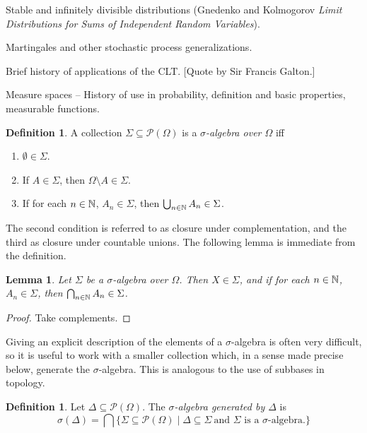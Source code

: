 \documentclass{amsart}
\newtheorem{lemma}[theorem]{Lemma}
\theoremstyle{definition}
\newtheorem{definition}[theorem]{Definition}
\theoremstyle{remark}
\newcommand{\bldset}[2]{\{{#1}\mid{#2}\}}
\begin{document}
Stable and infinitely divisible distributions (Gnedenko and Kolmogorov {\em Limit Distributions for Sums of Independent Random Variables}).

Martingales and other stochastic process generalizations.

Brief history of applications of the CLT. [Quote by Sir Francis Galton.]


Measure spaces -- History of use in probability, definition and basic properties, measurable functions.

\begin{definition}
A collection $\Sigma \subseteq \mathcal P (\Omega)$ is a {\em $\sigma$-algebra over $\Omega$} iff
\begin{enumerate}
\item $\emptyset \in \Sigma$.
\item If $A \in \Sigma$, then $\Omega \setminus A \in \Sigma$.
\item If for each $n \in \mathbb{N}$, $A_n \in \Sigma$, then $\bigcup_{n \in \mathbb{N}} A_n \in \Sigma$.
\end{enumerate}
\end{definition}

The second condition is referred to as closure under complementation, and the third as closure under countable unions. The following lemma is immediate from the definition.

\begin{lemma}
Let $\Sigma$ be a $\sigma$-algebra over $\Omega$. Then $X \in \Sigma$, and if for each $n \in \mathbb{N}$, $A_n \in \Sigma$, then $\bigcap_{n \in \mathbb{N}} A_n \in \Sigma$.
\end{lemma}

\begin{proof}
Take complements.
\end{proof}

Giving an explicit description of the elements of a $\sigma$-algebra is often very difficult, so it is useful to work with a smaller collection which, in a sense made precise below, generate the $\sigma$-algebra. This is analogous to the use of subbases in topology.

\begin{definition}
Let $\Delta \subseteq \mathcal P (\Omega)$. The {\em $\sigma$-algebra generated by $\Delta$} is
\[ \sigma(\Delta) = \bigcap \bldset{\Sigma \subseteq \mathcal P (\Omega)}{\Delta \subseteq \Sigma \ \text{and $\Sigma$ is a $\sigma$-algebra.}} \]
\end{definition}
\end{document}
